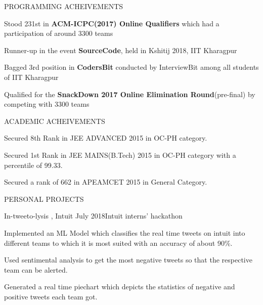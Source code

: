 \documentclass{resume} %
\begin{document}
\begin{rSection}{ PROGRAMMING ACHEIVEMENTS } \itemsep -3pt        

\item Stood 231st in \textbf{ACM-ICPC(2017) Online Qualifiers} which had a participation of around 3300 teams
\item Runner-up in the event \textbf{SourceCode}, held in Kshitij 2018, IIT Kharagpur
\item Bagged 3rd position in \textbf{CodersBit} conducted by InterviewBit among all students of IIT Kharagpur
\item Qualified for the \textbf{SnackDown 2017 Online Elimination Round}(pre-final)  by competing with 3300 teams
 
\end{rSection}


\begin{rSection}{ ACADEMIC ACHEIVEMENTS } \itemsep -3pt        

\item Secured 8th Rank in JEE ADVANCED 2015 in OC-PH category.
\item Secured 1st Rank in JEE MAINS(B.Tech) 2015 in OC-PH category with a percentile of 99.33.
\item Secured a rank of 662 in APEAMCET 2015 in General Category. 
\end{rSection}


\begin{rSection}{PERSONAL PROJECTS}

\begin{rSubsection}{In-tweeto-lysis , Intuit } {July 2018}{Intuit interns' hackathon}{} 
\item Implemented an ML Model which classifies the real time tweets on intuit into different teams to which it is most suited with an accuracy of about 90\%.           
\item Used sentimental analysis to get the most negative tweets so that the respective team can be alerted.
\item Generated a real time piechart which depicts the statistics of negative and positive tweets each team got.     
\end{rSubsection}

\end{rSection}
\end{document}
